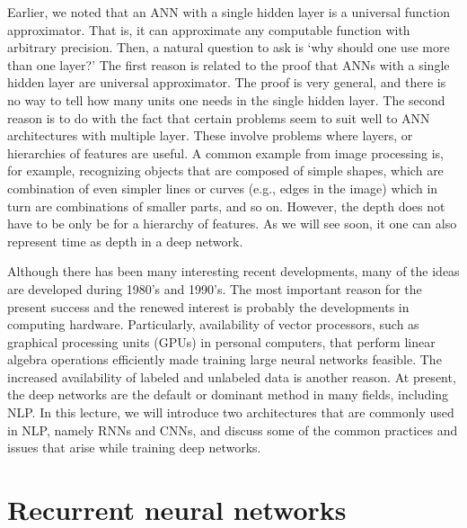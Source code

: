 Earlier, we noted that an ANN with a single hidden layer is
a universal function approximator.
That is, it can approximate any computable function
with arbitrary precision.
Then, a natural question to ask is `why should one use more than one layer?'
The first reason is related to the proof that ANNs with a single hidden layer
are universal approximator.
The proof is very general,
and there is no way to tell how many units one needs in
the single hidden layer.
The second reason is to do with the fact that
certain problems seem to suit well to ANN architectures
with multiple layer.
These involve problems where layers, or hierarchies of features are useful.
A common example from image processing is,
for example,
recognizing objects that are composed of simple shapes,
which are combination of even simpler lines or curves (e.g., edges in the image)
which in turn are combinations of smaller parts,
and so on.
However,
the depth does not have to be only be for a hierarchy of features.
As we will see soon,
it one can also represent time as depth in a deep network.

Although there has been many interesting recent developments,
many of the ideas are developed during 1980's and 1990's.
The most important reason for the present success and the renewed interest
is probably the developments in computing hardware.
Particularly, availability of vector processors,
such as graphical processing units (GPUs) in personal computers,
that perform linear algebra operations efficiently
made training large neural networks feasible.
The increased availability of labeled and unlabeled data is another reason.
At present,
the deep networks are the default or dominant method in many fields,
including NLP.
In this lecture, we will introduce two architectures that are commonly used
in NLP, namely RNNs and CNNs,
and discuss some of the common practices and issues that arise
while training deep networks.

\section{Recurrent neural networks}

